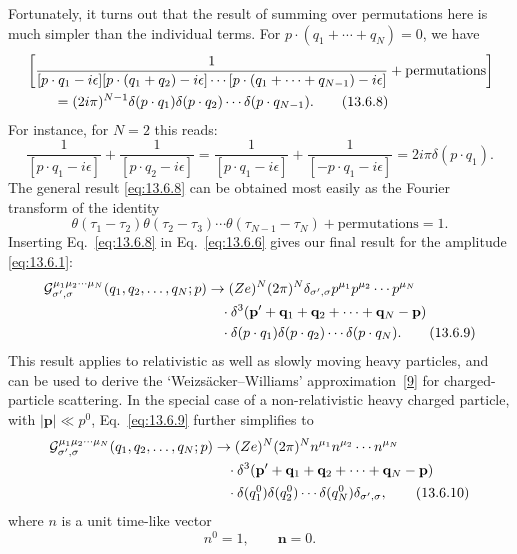 Fortunately, it turns out that the result of summing over permutations
here is much simpler than the individual terms. For
$p\cdot(q_1+\cdots+q_N)=0$, we have
\begin{align}
&\left[
\frac{1}{[p\cdot q_1-i\epsilon]
[p\cdot(q_1+q_2)-i\epsilon]\cdots
[p\cdot(q_1+\cdots+q_{N-1})-i\epsilon]}
+\text{permutations}\right]
\notag\\
&\qquad=(2i\pi)^{N-1}\delta(p\cdot q_1)\delta(p\cdot q_2)
\cdots\delta(p\cdot q_{N-1}).
\tag{13.6.8}\label{eq:13.6.8}
\end{align}
For instance, for $N=2$ this reads:
\begin{equation*}
\frac{1}{[p\cdot q_1-i\epsilon]}+\frac{1}{[p\cdot q_2-i\epsilon]}
=\frac{1}{[p\cdot q_1-i\epsilon]}+\frac{1}{[-p\cdot q_1-i\epsilon]}
=2i\pi\delta(p\cdot q_1).
\end{equation*}
The general result \eqref{eq:13.6.8} can be obtained most easily as the Fourier
transform of the identity
\begin{equation*}
\theta(\tau_1-\tau_2)\theta(\tau_2-\tau_3)\cdots
\theta(\tau_{N-1}-\tau_N)+\text{permutations}=1.
\end{equation*}
Inserting Eq.~\eqref{eq:13.6.8} in Eq.~\eqref{eq:13.6.6} gives our final result for the amplitude
\eqref{eq:13.6.1}:
\begin{align}
\mathcal G^{\mu_1\mu_2\cdots\mu_N}_{\sigma',\sigma}
(q_1,q_2,\ldots,q_N;p)
&\to
(Ze)^N(2\pi)^N\delta_{\sigma',\sigma}
p^{\mu_1}p^{\mu_2}\cdots p^{\mu_N}
\notag\\
&\quad\cdot
\delta^3(\mathbf p'+\mathbf q_1+\mathbf q_2+\cdots+\mathbf q_N-\mathbf p)
\notag\\
&\quad\cdot
\delta(p\cdot q_1)\delta(p\cdot q_2)\cdots\delta(p\cdot q_N).
\tag{13.6.9}\label{eq:13.6.9}
\end{align}
This result applies to relativistic as well as slowly moving heavy particles,
and can be used to derive the `Weizs\"acker--Williams' approximation~\hyperref[ref:13.9]{[9]} for
charged-particle scattering. In the special case of a non-relativistic heavy
charged particle, with $|\mathbf p|\ll p^0$, Eq.~\eqref{eq:13.6.9} further simplifies to
\begin{align}
\mathcal G^{\mu_1\mu_2\cdots\mu_N}_{\sigma',\sigma}
(q_1,q_2,\ldots,q_N;p)
&\to
(Ze)^N(2\pi)^N n^{\mu_1}n^{\mu_2}\cdots n^{\mu_N}
\notag\\
&\quad\cdot
\delta^3(\mathbf p'+\mathbf q_1+\mathbf q_2+\cdots+\mathbf q_N-\mathbf p)
\notag\\
&\quad\cdot
\delta(q_1^0)\delta(q_2^0)\cdots\delta(q_N^0)\delta_{\sigma',\sigma},
\tag{13.6.10}\label{eq:13.6.10}
\end{align}
where $n$ is a unit time-like vector
\begin{equation*}
n^0=1,\qquad \mathbf n=0.
\end{equation*}

